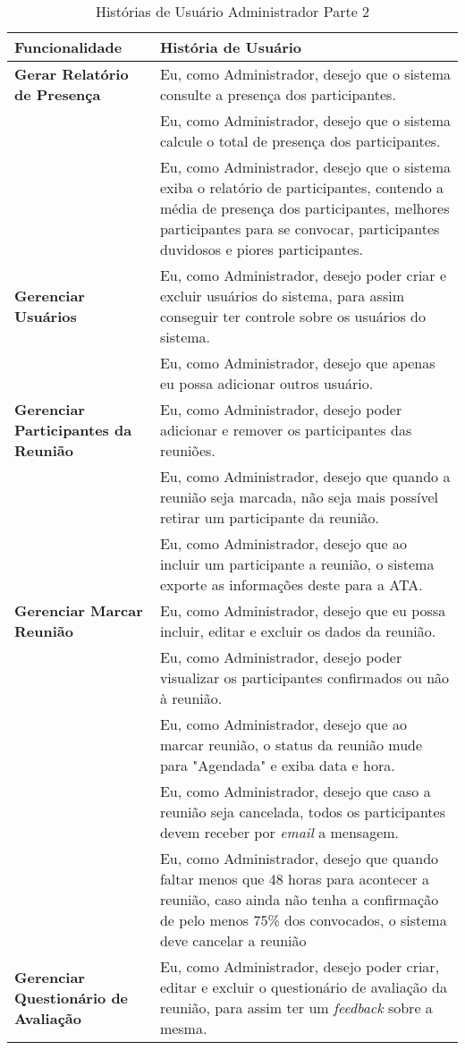 \begin{table}[H]
	\begin{tabular}{|p{5.0cm}|p{10.0cm}|} 
	\hline
	\textbf{Funcionalidade} & \textbf{História de Usuário} \\ \hline
	\textbf{Gerar Relatório de Presença} & Eu, como Administrador, desejo que o sistema consulte a presença dos participantes. \\ \hline
	& Eu, como Administrador, desejo que o sistema calcule o total de presença dos participantes. \\ \hline
	& Eu, como Administrador, desejo que o sistema exiba o relatório de participantes, contendo a média de presença dos participantes, melhores participantes para se convocar, participantes duvidosos e piores participantes. \\ \hline
	\textbf{Gerenciar Usuários} & Eu, como Administrador, desejo poder criar e excluir usuários do sistema, para assim conseguir ter controle sobre os usuários do sistema. \\ \hline
	& Eu, como Administrador, desejo que apenas eu possa adicionar outros usuário. \\ \hline
	\textbf{Gerenciar Participantes da Reunião} &  Eu, como Administrador, desejo poder adicionar e remover os participantes das reuniões. \\ \hline
	& Eu, como Administrador, desejo que quando a reunião seja marcada, não seja mais possível retirar um participante da reunião. \\ \hline
	& Eu, como Administrador, desejo que ao incluir um participante a reunião, o sistema exporte as informações deste para a ATA. \\ \hline
	\textbf{Gerenciar Marcar Reunião} & Eu, como Administrador, desejo que eu possa incluir, editar e excluir os dados da reunião. \\ \hline
	& Eu, como Administrador, desejo poder visualizar os participantes confirmados ou não à reunião. \\ \hline
	& Eu, como Administrador, desejo que ao marcar reunião, o status da reunião mude para "Agendada" e exiba data e hora. \\ \hline
	& Eu, como Administrador, desejo que caso a reunião seja cancelada, todos os participantes devem receber por \textit{email} a mensagem. \\ \hline
	& Eu, como Administrador, desejo que quando faltar menos que 48 horas para acontecer a reunião, caso ainda não tenha a confirmação de pelo menos 75\% dos convocados, o sistema deve cancelar a reunião \\ \hline
	\textbf{Gerenciar Questionário de Avaliação} & Eu, como Administrador, desejo poder criar, editar e excluir o questionário de avaliação da reunião, para assim ter um \textit{feedback} sobre a mesma. \\ \hline 
	\end{tabular}
	 \caption{Histórias de Usuário Administrador Parte 2}
	 \label{tab:historias_de_usuario_administrador_parte2}
\end{table}

